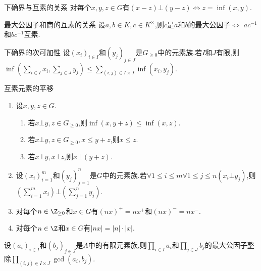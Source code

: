 \begin{proposition}{下确界与互素的关系}{}
	对每个$x,y,z\in G$有$\left(x-z\right)\bot\left(y-z\right)\iff z=\inf\left(x,y\right)$.
\end{proposition}

\begin{proposition}{最大公因子和商的互素的关系}{}
	设$a,b\in K,c\in K^{\times}$,则$c$是$a$和$b$的最大公因子$\iff$ $ac^{-1}$和$bc^{-1}$互素.
\end{proposition}

\begin{proposition}{下确界的次可加性}{}
	设$\left(x_{i}\right)_{i\in I}$和$\left(y_{j}\right)_{j\in J}$是$G_{\geq 0}$中的元素族.若$I$和$J$有限,则$\inf\left(\sum\limits_{i\in I}x_{i},\sum\limits_{j\in J}y_{j}\right)\leq\sum\limits_{\left(i,j\right)\in I\times J}\inf\left(x_{i},y_{j}\right)$.
\end{proposition}

\begin{corollary}{互素元素的平移}{}
	\begin{enumerate}
		\item 设$x,y,z\in G$.
		\begin{enumerate}
			\item 若$x\bot y,z\in G_{\geq 0}$,则$\inf\left(x,y+z\right)\leq\inf\left(x,z\right)$.
			\item 若$x\bot y,z\in G_{\geq 0},x\leq y+z$,则$x\leq z$.
			\item 若$x\bot y,x\bot z$,则$x\bot\left(y+z\right)$.
		\end{enumerate}
		\item 设$\left(x_{i}\right)_{i=1}^{m}$和$\left(y_{j}\right)_{j=1}^{n}$是$G$中的元素族.若$\forall 1\leq i\leq m\forall 1\leq j\leq n\left(x_{i}\bot y_{j}\right)$,则$\left(\sum\limits_{i=1}^{m}x_{i}\right)\bot\left(\sum\limits_{j=1}^{n}y_{j}\right)$.
		\item 对每个$n\in\Z_{\geq 0}$和$x\in G$有$\left(nx\right)^{+}=nx^{+}$和$\left(nx\right)^{-}=nx^{-}$.
		\item 对每个$n\in\Z$和$x\in G$有$\left|nx\right|=\left|n\right|\cdot\left|x\right|$.
	\end{enumerate}
\end{corollary}

\begin{proposition}{}{}
	设$\left(a_{i}\right)_{i\in I}$和$\left(b_{j}\right)_{j\in J}$是$A$中的有限元素族,则$\prod\limits_{i\in I}a_{i}$和$\prod\limits_{j\in J}b_{j}$的最大公因子整除$\prod\limits_{\left(i,j\right)\in I\times J}\gcd\left(a_{i},b_{j}\right)$.
\end{proposition}

